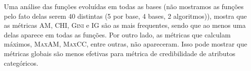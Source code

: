 Uma análise das funções evoluídas em todas as bases (não mostramos as funções pelo fato delas serem 40 distintas (5 por base, 4 bases, 2 algoritmos)), mostra que as métricas \textsc{AM}, \textsc{CHI}, \textsc{Gini} e \textsc{IG} são as mais frequentes, sendo que ao menos uma delas aparece em todas as funções. Por outro lado, as métricas que calculam máximos, \textsc{MaxAM}, \textsc{MaxCC}, entre outras, não apareceram. Isso pode mostrar que métricas globais são menos efetivas para métrica de credibilidade de atributos categóricos.


